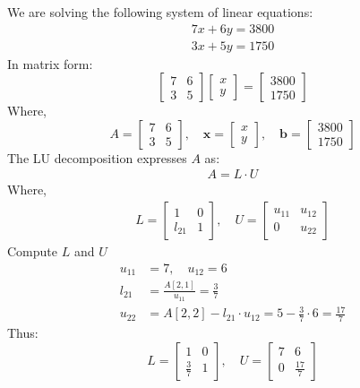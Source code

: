 \documentclass[journal]{IEEEtran}
\begin{document}
We are solving the following system of linear equations:
\begin{align}
7x + 6y = 3800
\end{align}
\begin{align}
3x + 5y = 1750
\end{align}
In matrix form:
\[
\begin{bmatrix}
7 & 6 \\
3 & 5
\end{bmatrix}
\begin{bmatrix}
x \\
y
\end{bmatrix}
=
\begin{bmatrix}
3800 \\
1750
\end{bmatrix}
\]
Where,
\[
A = 
\begin{bmatrix}
7 & 6 \\
3 & 5
\end{bmatrix}, \quad
\mathbf{x} = 
\begin{bmatrix}
x \\
y
\end{bmatrix}, \quad
\mathbf{b} = 
\begin{bmatrix}
3800 \\
1750
\end{bmatrix}
\]
The LU decomposition expresses \(A\) as:
\begin{align}
    A = L \cdot U
\end{align}
Where,
\begin{align}
    L = 
\begin{bmatrix}
1 & 0 \\
l_{21} & 1
\end{bmatrix}, \quad
U = 
\begin{bmatrix}
u_{11} & u_{12} \\
0 & u_{22}
\end{bmatrix}
\end{align}
Compute \(L\) and \(U\)
\begin{align}
u_{11} &= 7, \quad u_{12} = 6 \\
l_{21} &= \frac{A[2,1]}{u_{11}} = \frac{3}{7} \\
u_{22} &= A[2,2] - l_{21} \cdot u_{12} = 5 - \frac{3}{7} \cdot 6 = \frac{17}{7}
\end{align}
Thus:
\[
L = 
\begin{bmatrix}
1 & 0 \\
\frac{3}{7} & 1
\end{bmatrix}, \quad
U = 
\begin{bmatrix}
7 & 6 \\
0 & \frac{17}{7}
\end{bmatrix}
\]
\end{document}
